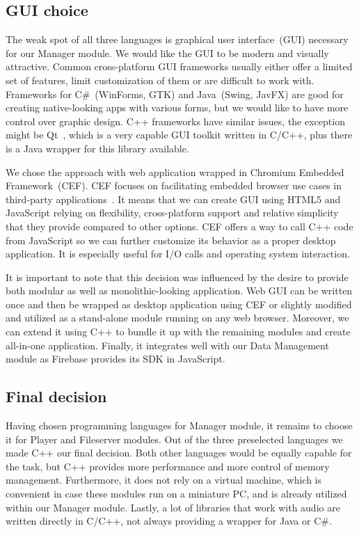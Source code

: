 \subsection{GUI choice}

The weak spot of all three languages is graphical user interface~(GUI) necessary for our Manager module. We would like the GUI to be modern and visually attractive. Common cross-platform GUI frameworks usually either offer a limited set of features, limit customization of them or are difficult to work with. Frameworks for C\#~(WinForms, GTK) and Java~(Swing, JavFX) are good for creating native-looking apps with various forms, but we would like to have more control over graphic design. C++ frameworks have similar issues, the exception might be Qt~\citep{qt}, which is a very capable GUI toolkit written in C/C++, plus there is a Java wrapper for this library available.
\par
We chose the approach with web application wrapped in Chromium Embedded Framework~(CEF). CEF focuses on facilitating embedded browser use cases in third-party applications~\citep{cef}. It means that we can create GUI using HTML5 and JavaScript relying on flexibility, cross-platform support and relative simplicity that they provide compared to other options. CEF offers a way to call C++ code from JavaScript so we can further customize its behavior as a proper desktop application. It is especially useful for I/O calls and operating system interaction.
\par
It is important to note that this decision was influenced by the desire to provide both modular as well as monolithic-looking application. Web GUI can be written once and then be wrapped as desktop application using CEF or slightly modified and utilized as a stand-alone module running on any web browser. Moreover, we can extend it using C++ to bundle it up with the remaining modules and create all-in-one application. Finally, it integrates well with our Data Management module as Firebase provides its SDK in JavaScript.

\subsection{Final decision}

Having chosen programming languages for Manager module, it remains to choose it for Player and Fileserver modules. Out of the three preselected languages we made C++ our final decision.
Both other languages would be equally capable for the task, but C++ provides more performance and more control of memory management. Furthermore, it does not rely on a virtual machine, which is convenient in case these modules run on a miniature PC, and is already utilized within our Manager module. Lastly, a lot of libraries that work with audio are written directly in C/C++, not always providing a wrapper for Java or C\#.

